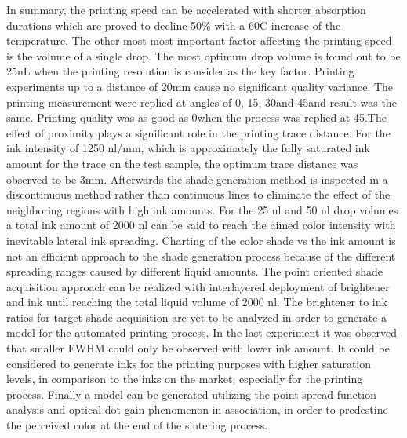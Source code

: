 In summary, the printing speed can be accelerated with shorter absorption durations which are proved to decline 50\% with a 60\textdegree C increase of the temperature. The other most most important factor affecting the printing speed is the volume of a single drop. The most optimum drop volume is found out to be 25nL when the printing resolution is consider as the key factor. Printing experiments up to a distance of 20mm cause no significant quality variance. The printing measurement were replied at angles of 0\textdegree \space, 15\textdegree \space, 30\textdegree \space and 45\textdegree \space and result was the same. Printing quality was as good as 0\textdegree \space  when the process was replied at 45\textdegree \space .The effect of proximity plays a significant role in the printing trace distance. For the ink intensity of 1250 nl/mm, which is approximately the fully saturated ink amount for the trace on the test sample, the optimum trace distance  was observed to be 3mm. Afterwards the shade generation method is inspected in a discontinuous method rather than continuous lines to eliminate the effect of the neighboring regions with high ink amounts. For the 25 nl and 50 nl drop volumes a total ink amount of 2000 nl can be said to reach the aimed color intensity with inevitable lateral ink spreading. Charting of the color shade vs the ink amount is not an efficient approach to the shade generation process because of the different spreading ranges caused by different liquid amounts. The point oriented shade acquisition approach can be realized with interlayered deployment of brightener and ink until reaching the total liquid volume of 2000 nl. The brightener to ink ratios for target shade acquisition are yet to be analyzed in order to generate a model for the automated printing process. In the last experiment it was observed that smaller FWHM could only be observed with lower ink amount. It could be considered to generate inks for the printing purposes with higher saturation levels, in comparison to the inks on the market, especially for the printing process. Finally a model can be generated utilizing the point spread function analysis and optical dot gain phenomenon in association, in order to predestine the perceived color at the end of the sintering process. 